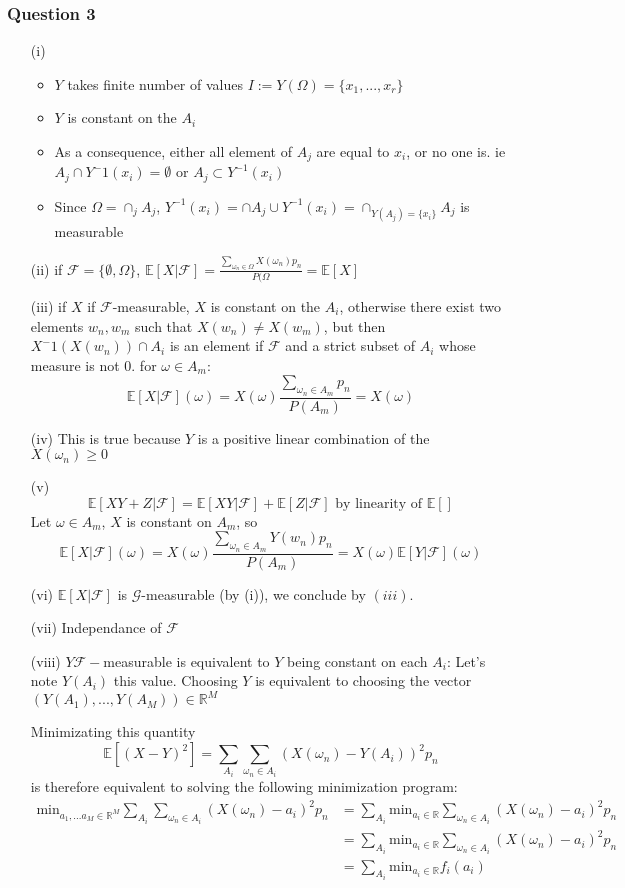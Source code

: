 \documentclass[12pt]{article}
\newcommand{\Q}[1]{\subsubsection*{Question #1}}
\newcommand{\Exp}[1]{\mathbb{E}[#1]}
\newcommand{\Fil}{\mathcal{F}}
\newcommand{\FExp}[1]{\mathbb{E}[#1 | \Fil]}
\newcommand{\Gil}{\mathcal{G}}
\begin{document}
\Q{3}
\begin{itemize}
Let's note $Y = \Exp{X | \Fil}$

\item [(i)]
\begin{itemize}
\item $Y$ takes finite number of values $I := Y(\Omega) = \{x_1, ..., x_r\}$
\item $Y$ is constant on the $A_i$
\item As a consequence, either all element of $A_j$ are equal to $x_i$, or no one is. ie $A_j \cap Y^-1(x_i) = \emptyset$ or $A_j \subset Y^{-1}(x_i)$
\item Since $\Omega = \cap_j A_j$, $Y^{-1}(x_i) = \cap A_j \cup Y^{-1}(x_i) = \cap_{Y(A_j) = \{x_i\}}  A_j$ is measurable
\end{itemize}
\item [(ii)] if $\Fil = \{\emptyset, \Omega\}$, $\Exp{X | \Fil} = \frac{\sum_{\omega_n \in \Omega} X(\omega_n) p_n}{P(\Omega} = \Exp{X}$
\item [(iii)] if $X$ if $\Fil$-measurable, $X$ is constant on the $A_i$, otherwise there exist two elements $w_n, w_m$ such that $X(w_n) \neq X(w_m)$, but then $X^-1( X(w_n) ) \cap A_i$ is an element if $\Fil$ and a strict subset of $A_i$ whose measure is not 0.
for $\omega \in A_m$: $$\Exp{X|\Fil}(\omega) = X(\omega ) \frac{\sum_{\omega_n \in A_m}  p_n}{P(A_m)} = X(\omega)$$
\item [(iv)] This is true because $Y$ is a positive linear combination of the $X(\omega_n) \geq 0$
\item [(v)] 
$$\FExp{X Y + Z} = \FExp{X Y} + \FExp{Z}  \text{ by linearity of } \Exp{}$$
Let $\omega \in A_m$, $X$ is constant on $A_m$, so
$$\FExp{X}(\omega) = X(\omega ) \frac{\sum_{\omega_n \in A_m} Y(w_n) p_n}{P(A_m)} = X(\omega) \FExp{Y}(\omega)$$
\item [(vi)]
$\FExp{X}$ is $\Gil$-measurable (by (i)), we conclude by $(iii)$.
\item [(vii)] Independance of $\Fil$
\item [(viii)] $Y \Fil-$measurable is equivalent to $Y$ being constant on each $A_i$: Let's note $Y(A_i)$ this value. Choosing $Y$ is equivalent to choosing the vector $(Y(A_1), ..., Y(A_M)) \in \mathbb{R}^M$

Minimizating this quantity
$$\Exp{(X-Y)^2} = \sum_{A_i} \sum_{\omega_n \in A_i} (X(\omega_n) - Y(A_i))^2 p_n$$
is therefore equivalent to solving the following minimization program:
\begin{align*}
\text{min}_{a_1, ... a_M \in \mathbb{R}^M }  \sum_{A_i} \sum_{\omega_n \in A_i} (X(\omega_n) - a_i)^2 p_n 
&=  \sum_{A_i} \text{min}_{a_i \in \mathbb{R}} \sum_{\omega_n \in A_i} (X(\omega_n) - a_i)^2 p_n
\\ &= \sum_{A_i} \text{min}_{a_i \in \mathbb{R}} \sum_{\omega_n \in A_i} (X(\omega_n) - a_i)^2 p_n
\\ &= \sum_{A_i} \text{min}_{a_i \in \mathbb{R}} f_i(a_i)
\end{align*}


\end{itemize}
\end{document}
